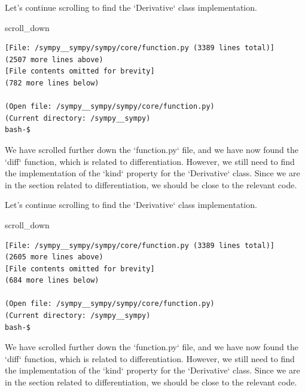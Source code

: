 {\begin{agentbox}
Let's continue scrolling to find the `Derivative` class implementation.



\hrulefill
\begin{CodeVerbatim}[breaklines=true, breakanywhere=true]
scroll_down
\end{CodeVerbatim}
\end{agentbox}
\begin{observationbox}\begin{Verbatim}[breaklines=true, breakanywhere=true]
[File: /sympy__sympy/sympy/core/function.py (3389 lines total)]
(2507 more lines above)
[File contents omitted for brevity]
(782 more lines below)

(Open file: /sympy__sympy/sympy/core/function.py)
(Current directory: /sympy__sympy)
bash-$
\end{Verbatim}
\end{observationbox}
\begin{agentbox}
We have scrolled further down the `function.py` file, and we have now found the `diff` function, which is related to differentiation. However, we still need to find the implementation of the `kind` property for the `Derivative` class. Since we are in the section related to differentiation, we should be close to the relevant code.



Let's continue scrolling to find the `Derivative` class implementation.



\hrulefill
\begin{CodeVerbatim}[breaklines=true, breakanywhere=true]
scroll_down
\end{CodeVerbatim}
\end{agentbox}
\begin{observationbox}\begin{Verbatim}[breaklines=true, breakanywhere=true]
[File: /sympy__sympy/sympy/core/function.py (3389 lines total)]
(2605 more lines above)
[File contents omitted for brevity]
(684 more lines below)

(Open file: /sympy__sympy/sympy/core/function.py)
(Current directory: /sympy__sympy)
bash-$
\end{Verbatim}
\end{observationbox}
\begin{agentbox}
We have scrolled further down the `function.py` file, and we have now found the `diff` function, which is related to differentiation. However, we still need to find the implementation of the `kind` property for the `Derivative` class. Since we are in the section related to differentiation, we should be close to the relevant code.




\end{agentbox}}
